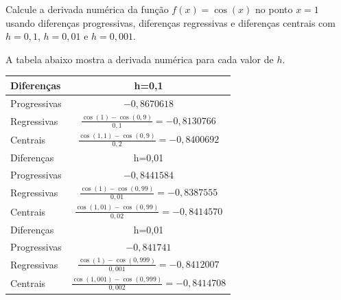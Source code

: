 \begin{ex}
Calcule a derivada numérica da função $f(x)=\cos(x)$ no ponto $x=1$ usando diferenças progressivas, diferenças regressivas e diferenças centrais com $h=0,1$, $h=0,01$ e $h=0,001$.
\end{ex}
\begin{sol}
A tabela abaixo mostra a derivada numérica para cada valor de $h$.
\begin{center}
\begin{tabular}{|l|c|} \hline
  Diferenças & h=0,1 \\ \hline
  Progressivas & $\displaystyle -0,8670618$ \\
  Regressivas  & $\displaystyle \frac{\cos(1)-\cos(0,9)}{0,1} = -0,8130766$ \\
  Centrais     & $\displaystyle \frac{\cos(1,1)-\cos(0,9)}{0,2} = -0,8400692$ \\ \hline
  Diferenças & h=0,01 \\ \hline
  Progressivas & $\displaystyle -0,8441584$ \\
  Regressivas  & $\displaystyle \frac{\cos(1)-\cos(0,99)}{0,01} = -0,8387555$ \\
  Centrais     & $\displaystyle \frac{\cos(1,01)-\cos(0,99)}{0,02} = -0,8414570$ \\ \hline
  Diferenças & h=0,01 \\ \hline
  Progressivas & $\displaystyle -0,841741$ \\
  Regressivas  & $\displaystyle \frac{\cos(1)-\cos(0,999)}{0,001} = -0,8412007$ \\
  Centrais     & $\displaystyle \frac{\cos(1,001)-\cos(0,999)}{0,002} = -0,8414708$ \\ \hline
\end{tabular}  
\end{center}  
\end{sol}

